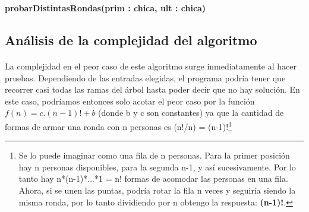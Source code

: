 \incmargin{1em}
\linesnumbered
{}

\textbf{probarDistintasRondas(prim : chica, ult : chica)}\\
	\begin{algorithm}[H]
		\BlankLine


  \end{algorithm}



\subsection{Análisis de la complejidad del algoritmo}
\label{complejidadej2}

\paragraph{}
La complejidad en el peor caso de este algoritmo surge inmediatamente al hacer pruebas. Dependiendo de las entradas elegidas, el programa podría tener que 
recorrer casi todas las ramas del árbol hasta poder decir que no hay solución. En este caso, podríamos entonces solo acotar el peor caso por la función $f(n) = c.(n-1)! + b$ 
(donde b y c son constantes) ya que la cantidad de formas de armar una ronda con n personas es (n!/n) = (n-1)!\footnote{Se lo puede imaginar como una fila de n personas. Para la primer posición hay n personas disponibles, para la segunda n-1, y así sucesivamente. Por lo tanto hay n*(n-1)*...*1 = n! formas de acomodar las personas en una fila. Ahora, si se unen las puntas, podría rotar la fila n veces y seguiría siendo la misma ronda, por lo tanto dividiendo por n obtengo la respuesta: \textbf{(n-1)!}.} 

